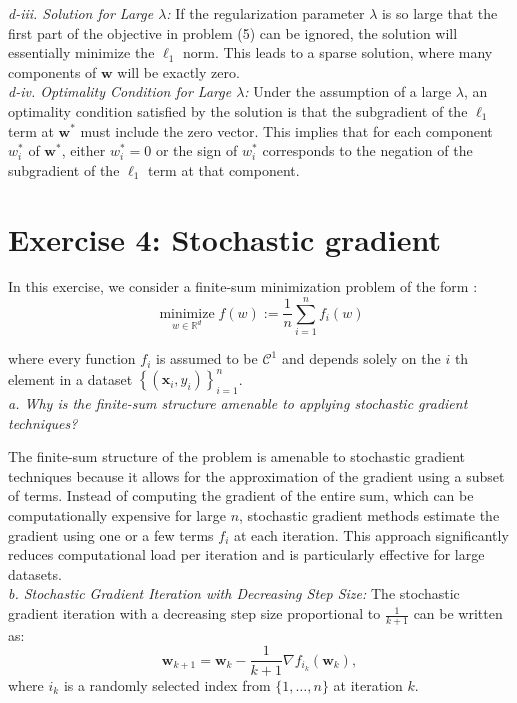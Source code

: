 \documentclass[12pt]{article}
\begin{document}
    \textit{d-iii. Solution for Large \(\lambda\):}
    If the regularization parameter \(\lambda\) is so large that the first part of the objective in problem (5) can be ignored, the solution will essentially minimize the $\ell_{1}$ norm. This leads to a sparse solution, where many components of \(\boldsymbol{w}\) will be exactly zero.\\

    \textit{d-iv. Optimality Condition for Large \(\lambda\):}
    Under the assumption of a large \(\lambda\), an optimality condition satisfied by the solution is that the subgradient of the $\ell_{1}$ term at \(\boldsymbol{w}^*\) must include the zero vector. This implies that for each component \(w_i^*\) of \(\boldsymbol{w}^*\), either \(w_i^* = 0\) or the sign of \(w_i^*\) corresponds to the negation of the subgradient of the $\ell_{1}$ term at that component.\\

    \section*{Exercise 4: Stochastic gradient}

    In this exercise, we consider a finite-sum minimization problem of the form :
    $$
    \underset{w \in \mathbb{R}^{d}}{\operatorname{minimize}} f(w):=\frac{1}{n} \sum_{i=1}^{n} f_{i}(w)
    $$

    where every function $f_{i}$ is assumed to be $\mathcal{C}^{1}$ and depends solely on the $i$ th element in a dataset $\left\{\left(\boldsymbol{x}_{i}, y_{i}\right)\right\}_{i=1}^{n}$.\\

    \textit{a. Why is the finite-sum structure amenable to applying stochastic gradient techniques?}

    The finite-sum structure of the problem is amenable to stochastic gradient techniques because it allows for the approximation of the gradient using a subset of terms. Instead of computing the gradient of the entire sum, which can be computationally expensive for large \(n\), stochastic gradient methods estimate the gradient using one or a few terms \(f_i\) at each iteration. This approach significantly reduces computational load per iteration and is particularly effective for large datasets.\\

    \textit{b. Stochastic Gradient Iteration with Decreasing Step Size:}
    The stochastic gradient iteration with a decreasing step size proportional to \(\frac{1}{k+1}\) can be written as:
    \[
        \boldsymbol{w}_{k+1} = \boldsymbol{w}_k - \frac{1}{k+1} \nabla f_{i_k}(\boldsymbol{w}_k),
    \]
    where \(i_k\) is a randomly selected index from \(\{1, \ldots, n\}\) at iteration \(k\).\\
\end{document}
